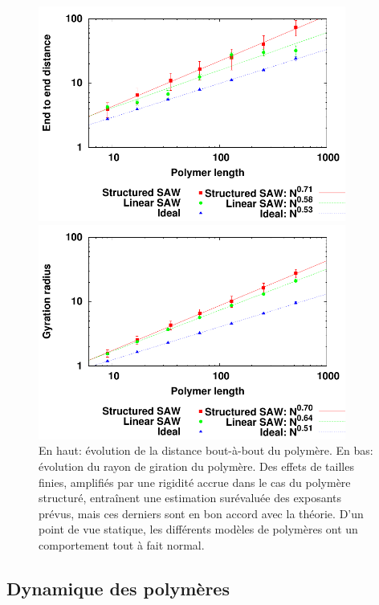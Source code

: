\begin{figure}[H]
\begin{center}
\includegraphics[width=0.9\textwidth]{endtoenddistance.pdf}

\includegraphics[width=0.9\textwidth]{gyration.pdf}

\caption[Résultats numériques: caractéristiques statiques.]{En haut: évolution de la distance bout-à-bout du polymère. En bas: évolution du rayon de giration du polymère. Des effets de tailles finies, amplifiés par une rigidité accrue dans le cas du polymère structuré, entraînent une estimation surévaluée des exposants prévus, mais ces derniers sont en bon accord avec la théorie. D'un point de vue statique, les différents modèles de polymères ont un comportement tout à fait normal.}
\label{statiquenum}
\end{center}
\end{figure}

\subsection{Dynamique des polymères}
